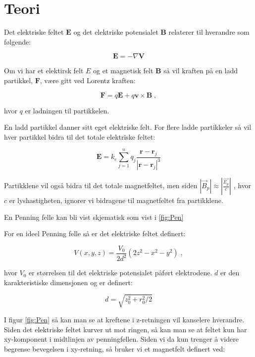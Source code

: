 \documentclass[reprint,english,notitlepage, nofootinbib]{revtex4-1}  %
\begin{document}
\section{Teori}   %
Det elektriske feltet $\mathbf{E}$ og det elektriske potensialet $\mathbf{B}$ relaterer til hverandre som følgende:

\begin{equation}\label{E}
\mathbf{E} = - \nabla{\mathbf{V}}
\end{equation}

Om vi har et elektirsk felt $E$ og et magnetisk felt $\mathbf{B}$ så vil kraften på en ladd partikkel, $\mathbf{F}$, være gitt ved Lorentz kraften:

\begin{equation}\label{F}
\mathbf{F} = q\mathbf{E} + q\mathbf{v}\times \mathbf{B} \; ,
\end{equation}

hvor $q$ er ladningen til partikkelen. 

En ladd partikkel danner sitt eget elektriske felt. For flere ladde partikkeler så vil hver partikkel bidra til det totale elektriske feltet:

\begin{equation}\label{Esum}
\mathbf{E} = k_e \sum_{j=1}^{n} q_j \frac{\mathbf{r} - \mathbf{r}_j}{\left | \mathbf{r} - \mathbf{r}_j \right |^3} 
\end{equation}

Partikklene vil også bidra til det totale magnetfeltet, men siden \tiny{${\left |\vec{B}_p \right | \approx \left | \frac{\vec{E_p}}{c} \right |}$} \normalsize{}, hvor $c$ er lyshastigheten, ignorer vi bidragene til magnetfeltet fra partikklene.   

En Penning felle kan bli vist skjematisk som vist i \autoref{fig:Pen}

For en ideel Penning felle så er det elektriske feltet definert:

\begin{equation}\label{V}
V(x,y,z) = \frac{V_0}{2d^2}\left (2z^2 - x^2 -y^2 \right ) \; ,
\end{equation}

hvor $V_0$ er størrelsen til det elektriske potensialet påført elektrodene. $d$ er den karakteristiske dimensjonen og er definert:

\begin{equation}\label{d}
d = \sqrt{z_0^2 + r_0^2/2}
\end{equation}

I figur \autoref{fig:Pen} så kan man se at kreftene i z-retningen vil kanselere hverandre. Siden det elektriske feltet kurver ut mot ringen, så kan man se at feltet kun har xy-komponent i midtlinjen av penningfellen. Siden vi da kun trenger å videre begrense bevegelsen i xy-retning, så bruker vi et magnetfelt definert ved:
\end{document}
